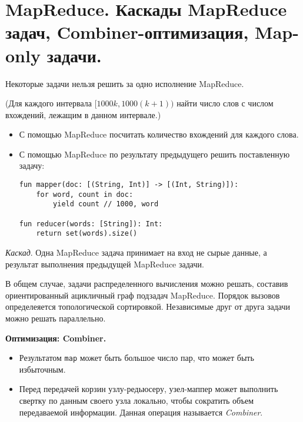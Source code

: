 \section{MapReduce. Каскады MapReduce задач, Combiner-оптимизация, Map-only
  задачи.}

Некоторые задачи нельзя решить за одно исполнение MapReduce.


\begin{example}(Для каждого интервала $[1000k, 1000(k + 1))$ найти число слов с
  числом вхождений, лежащим в данном интервале.)
  \begin{itemize}
    \item С помощью MapReduce посчитать количество вхождений для каждого слова.
    \item С помощью MapReduce по результату предыдущего решить поставленную
      задачу:
      \begin{lstlisting}
fun mapper(doc: [(String, Int)] -> [(Int, String)]):
    for word, count in doc:
        yield count // 1000, word

fun reducer(words: [String]): Int:
    return set(words).size()
      \end{lstlisting}
  \end{itemize}
\end{example}

\begin{definition}
    \textit{Каскад}. Одна MapReduce задача принимает на вход не сырые данные, а результат выполнения предыдущей MapReduce задачи.

\end{definition}

\begin{proposition}
  В общем случае, задачи распределенного вычисления можно решать, составив
  ориентированный ацикличный граф подзадач MapReduce. Порядок вызовов определеяется
  топологической сортировкой. Независимые друг от друга задачи можно решать
  параллельно.
\end{proposition}

\textbf{Оптимизация: Combiner.}
\begin{itemize}
  \item Результатом \texttt{map} может быть большое число пар, что может быть
    избыточным.
  \item Перед передачей корзин узлу-редьюсеру, узел-маппер может выполнить
    свертку по данным своего узла локально, чтобы сократить объем передаваемой
    информации. Данная операция называется \textit{Combiner}.
\end{itemize}

